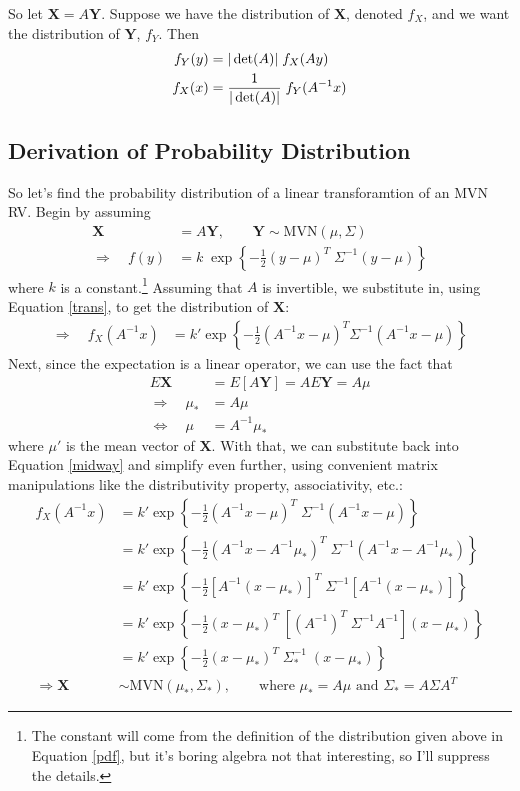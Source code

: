 \documentclass[a4paper,12pt]{scrartcl}
\begin{document}
So let $\mathbf{X} = A\mathbf{Y}$. Suppose we have the distribution of
$\mathbf{X}$, denoted $f_{{X}}$, and we want the distribution
of $\mathbf{Y}$, $f_{{Y}}$. Then
\begin{align}
    f_{{Y}}(y) &= |\det(A)| \; f_{{X}}(Ay) \notag \\
    f_{{X}}(x) &= \frac{1}{|\det(A)|} \; f_{{Y}}(A^{-1} x) 
	\label{trans}
\end{align}

\newpage
\subsection{Derivation of Probability Distribution}

So let's find the probability distribution of a linear transforamtion
of an MVN RV. Begin by assuming 
\begin{align*}
    \mathbf{X} &= A\mathbf{Y}, \qquad \mathbf{Y} \sim 
	\text{MVN}(\mu, \Sigma) \\
    \Rightarrow \quad f(y) &= k \; \exp\left\{-\frac{1}{2} (y - \mu)^T 
	\; \Sigma^{-1} (y-\mu)\right\}
\end{align*}
where $k$ is a constant.\footnote{The constant will come from the
definition of the distribution given above in Equation \ref{pdf}, but
it's boring algebra not that interesting, so I'll suppress the details.}
Assuming that $A$ is invertible, we substitute in, using Equation 
\ref{trans}, to get the distribution of $\mathbf{X}$:
\begin{align}
    \label{midway}
    \Rightarrow \quad f_X(A^{-1}x) &= k' \exp\left\{-\frac{1}{2} (A^{-1}x - \mu)^T 
	\Sigma^{-1} (A^{-1}x-\mu)\right\} 
\end{align}
Next, since the expectation is a linear operator, we can use the fact
that 
\begin{align*}
    E\mathbf{X} &= E[A\mathbf{Y}] = A E\mathbf{Y} = A \mu \\
    \Rightarrow \quad \mu_* &= A \mu \\
    \Leftrightarrow \quad \mu &= A^{-1} \mu_*
\end{align*}
where $\mu'$ is the mean vector of $\mathbf{X}$.  With that, we
can substitute back into Equation \ref{midway} and simplify even
further, using convenient matrix manipulations like the distributivity
property, associativity, etc.:
\begin{align*}
    f_X(A^{-1}x) &= k' \exp\left\{-\frac{1}{2} (A^{-1}x - \mu)^T \;
	\Sigma^{-1} (A^{-1}x-\mu)\right\} \\
    &= k' \exp\left\{-\frac{1}{2} (A^{-1}x - A^{-1}\mu_*)^T \;
	\Sigma^{-1} (A^{-1}x-A^{-1}\mu_*)\right\} \\
    &= k' \exp\left\{-\frac{1}{2} [A^{-1}(x - \mu_*)]^T \;
	\Sigma^{-1} [A^{-1}(x-\mu_*)]\right\} \\
    &= k' \exp\left\{-\frac{1}{2} (x - \mu_*)^T \; [(A^{-1})^T \;
	\Sigma^{-1} A^{-1}] (x-\mu_*)\right\} \\
    &= k' \exp\left\{-\frac{1}{2} (x - \mu_*)^T \;  
	\Sigma_*^{-1} \; (x-\mu_*)\right\} \\
    \Rightarrow \mathbf{X} &\sim  \text{MVN}(\mu_*, \Sigma_*), 
    \qquad \text{where $\mu_* = A\mu$ and $\Sigma_* = A\Sigma A^T $}
\end{align*}
\end{document}
